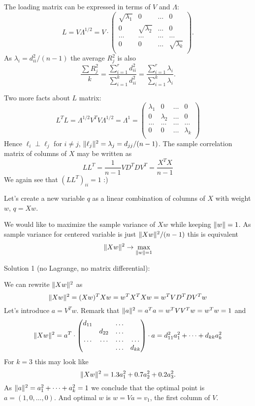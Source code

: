 \documentclass[12pt]{article}
\DeclarePairedDelimiter{\norm}{\lVert}{\rVert}
\begin{document}
The loading matrix can be expressed in terms of $V$ and $\Lambda$:
\[
L = V \Lambda^{1/2} = V \cdot \begin{pmatrix}
    \sqrt{\lambda_1 } & 0 & \dots & 0 \\
    0  & \sqrt{\lambda_2} & \dots & 0 \\
    \dots & \dots & \dots & \dots \\
    0 & 0 & \dots & \sqrt{\lambda_k} \\
\end{pmatrix}.
\]
As $\lambda_i = d_{ii}^2 / (n-1)$ the average $R^2_j$ is also 
\[
\frac{\sum R_j^2}{k} =  \frac{\sum_{i=1}^r d_{ii}^2}{\sum_{i=1}^k d_{ii}^2} =  \frac{\sum_{i=1}^r \lambda_i}{\sum_{i=1}^k \lambda_i} .
\]

Two more facts about $L$ matrix:
\[
L^T L = \Lambda^{1/2} V^T V \Lambda^{1/2} = \Lambda^1 =  \begin{pmatrix}
    \lambda_1 & 0 & \dots & 0 \\
    0  & \lambda_2 & \dots & 0 \\
    \dots & \dots & \dots & \dots \\
    0 & 0 & \dots & \lambda_k \\
\end{pmatrix}
\]
Hence $\ell_i \perp \ell_j$ for $i \neq j$, $\norm{\ell_j}^2= \lambda_j = d_{jj} / (n - 1)$.
The sample correlation matrix of columns of $X$ may be written as
\[
LL^T = \frac{1}{n-1}V D^T D V^T = \frac{X^TX}{n - 1}
\]
We again see that $(LL^T)_{ii} = 1$ :)

Let's create a new variable $q$ as a linear combination of columns of $X$ with weight $w$, $q = Xw$.

We would like to maximize the sample variance of $Xw$ while keeping $\norm{w} = 1$.
As sample variance for centered variable is just $\norm{Xw}^2 / (n - 1)$
this is equivalent
\[
\norm{Xw}^2  \to \max_{\norm{w} = 1}
\]

Solution 1 (no Lagrange, no matrix differential):

We can rewrite $\norm{Xw}^2$ as
\[
\norm{Xw}^2 = (Xw)^T Xw = w^T X^T Xw = w^T VD^T DV^T w
\]
Let's introduce $a = V^T w$.
Remark that $\norm{a}^2 = a^T a = w^T VV^T w = w^T w = 1$ and
\[
    \norm{Xw}^2 = a^T \cdot \begin{pmatrix}
        d_{11} &  & \dots &  \\
          & d_{22} & \dots &  \\
        \dots & \dots & \dots & \dots \\
         &  & \dots & d_{kk} \\
    \end{pmatrix} \cdot a
    = d_{11}^2 a_1^2 + \dots + d_{kk} a_k^2
\]
For $k = 3$ this may look like
\[
    \norm{Xw}^2 = 1.3 a_1^2 + 0.7 a_2^2 + 0.2 a_3^2.
\]
As $\norm{a}^2 = a_1^2 + \dots + a_k^2 = 1$ we conclude that the optimal point is $a = (1, 0, \dots, 0)$. 
And optimal $w$ is $w = Va = v_1$, the first column of $V$.
\end{document}
